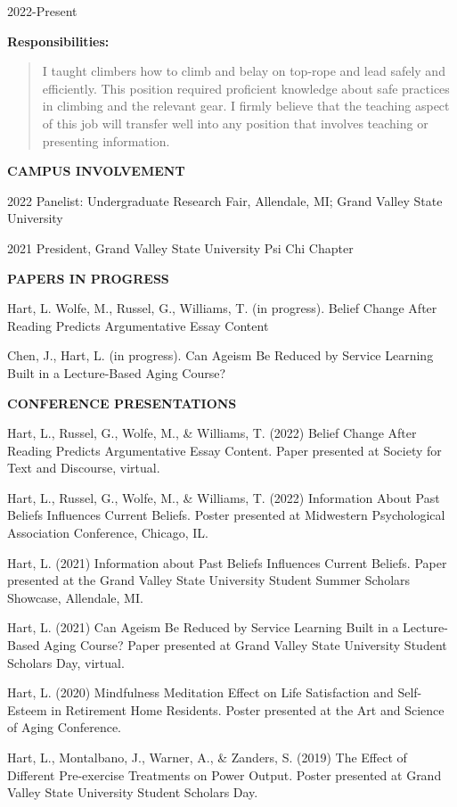 \documentclass[10pt,a4paper,]{article}
\begin{document}
2022-Present

\textbf{Responsibilities:}

\begin{quote}
I taught climbers how to climb and belay on top-rope and lead safely and
efficiently. This position required proficient knowledge about safe
practices in climbing and the relevant gear. I firmly believe that the
teaching aspect of this job will transfer well into any position that
involves teaching or presenting information.
\end{quote}

\textbf{CAMPUS INVOLVEMENT}

2022 Panelist: Undergraduate Research Fair, Allendale, MI; Grand Valley
State University

2021 President, Grand Valley State University Psi Chi Chapter

\textbf{PAPERS IN PROGRESS}

Hart, L. Wolfe, M., Russel, G., Williams, T. (in progress). Belief
Change After Reading Predicts Argumentative Essay Content

Chen, J., Hart, L. (in progress). Can Ageism Be Reduced by Service
Learning Built in a Lecture-Based Aging Course?

\textbf{CONFERENCE PRESENTATIONS}

Hart, L., Russel, G., Wolfe, M., \& Williams, T. (2022) Belief Change
After Reading Predicts Argumentative Essay Content. Paper presented at
Society for Text and Discourse, virtual.

Hart, L., Russel, G., Wolfe, M., \& Williams, T. (2022) Information
About Past Beliefs Influences Current Beliefs. Poster presented at
Midwestern Psychological Association Conference, Chicago, IL.

Hart, L. (2021) Information about Past Beliefs Influences Current
Beliefs. Paper presented at the Grand Valley State University Student
Summer Scholars Showcase, Allendale, MI.

Hart, L. (2021) Can Ageism Be Reduced by Service Learning Built in a
Lecture-Based Aging Course? Paper presented at Grand Valley State
University Student Scholars Day, virtual.

Hart, L. (2020) Mindfulness Meditation Effect on Life Satisfaction and
Self-Esteem in Retirement Home Residents. Poster presented at the Art
and Science of Aging Conference.

Hart, L., Montalbano, J., Warner, A., \& Zanders, S. (2019) The Effect
of Different Pre-exercise Treatments on Power Output. Poster presented
at Grand Valley State University Student Scholars Day.
\end{document}
